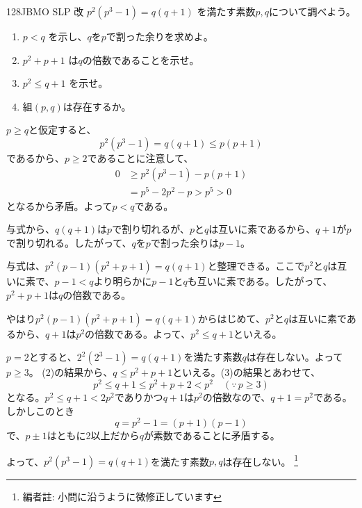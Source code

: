 \begin{thm}{128}{}{JBMO SLP 改}
 $p^2(p^3-1)=q(q+1)$ を満たす素数$p, q$について調べよう。
 \begin{enumerate}
  \item $p<q$ を示し、$q$を$p$で割った余りを求めよ。
  \item $p^2+p+1$ は$q$の倍数であることを示せ。
  \item $p^2\le q+1$ を示せ。
  \item 組$(p,q)$は存在するか。
 \end{enumerate}
\end{thm}

$p\ge q$と仮定すると、
\[ p^2(p^3-1)=q(q+1)\le p(p+1) \]
であるから、$p\ge 2$であることに注意して、
\begin{align*}
 0&\ge p^2(p^3-1)-p(p+1) \\
  &= p^5-2p^2-p > p^5 > 0
\end{align*}
となるから矛盾。よって$p<q$である。

与式から、$q(q+1)$は$p$で割り切れるが、$p$と$q$は互いに素であるから、$q+1$が$p$で割り切れる。したがって、$q$を$p$で割った余りは$p-1$。

与式は、$p^2(p-1)(p^2+p+1)=q(q+1)$と整理できる。ここで$p^2$と$q$は互いに素で、$p-1<q$より明らかに$p-1$と$q$も互いに素である。したがって、$p^2+p+1$は$q$の倍数である。

やはり$p^2(p-1)(p^2+p+1)=q(q+1)$からはじめて、$p^2$と$q$は互いに素であるから、$q+1$は$p^2$の倍数である。よって、$p^2\le q+1$といえる。

$p=2$とすると、$2^2(2^3-1)=q(q+1)$を満たす素数$q$は存在しない。よって$p\ge 3$。
(2)の結果から、$q\le p^2+p+1$といえる。(3)の結果とあわせて、
\[ p^2\le q+1\le p^2+p+2 < p^2 \quad (\because\, p\ge 3)\]
となる。$p^2\le q+1<2p^2$でありかつ$q+1$は$p^2$の倍数なので、$q+1=p^2$である。しかしこのとき
\[ q=p^2-1=(p+1)(p-1) \]
で、$p\pm 1$はともに2以上だから$q$が素数であることに矛盾する。

よって、$p^2(p^3-1)=q(q+1)$を満たす素数$p, q$は存在しない。
\footnote{編者註: 小問に沿うように微修正しています}